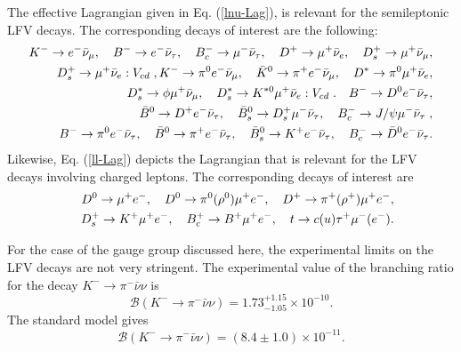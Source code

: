 \documentclass{ws-ijmpa}
\begin{document}
The effective Lagrangian given in Eq. (\ref{lnu-Lag}), is relevant for the semileptonic LFV decays. The corresponding decays of interest are the following:
\begin{eqnarray}
K^{-}  \to  e^{-}\bar{\nu}_{\mu}, \quad B^{-} \to  e^{-}\bar{\nu}_{\tau}, \quad B_c^{-} \to  \mu^{-}\bar{\nu}_{\tau}, \quad D^{+} \to  \mu^{+}\bar{\nu}_{e}, \quad D_{s}^{+} \to  \mu^{+}\bar{\nu}_{\mu},\notag\\
 \quad D_{s}^{+} \to  \mu^{+}\bar{\nu}_{e}: V_{cd}\;,
K^{-}  \to  \pi^{0} e^{-}\bar{\nu}_{\mu}, \quad \bar{K}^{0}\to \pi^{+} e^{-}\bar{\nu}_{\mu}, \quad D^{*} \to \pi^{0}\mu^{+}\bar{\nu}_{e},\label{decays-1}\\
 \quad D_{s}^{*} \to \phi \mu^{+}\bar{\nu}_{\mu}, \quad D_{s}^{*} \to  K^{* 0}\mu^{+}\bar{\nu}_{e}: V_{cd}\;. \quad
B^{-}  \to  D^{0} e^{-}\bar{\nu}_{\tau}, \label{decays-2}\\ 
\quad \bar{B}^{0}\to D^{+} e^{-}\bar{\nu}_{\tau}, \quad \bar{B}^{0}_{s} \to D^{+}_{s}\mu^{-}\bar{\nu}_{\tau}, \quad B_{c}^{-} \to J/\psi \mu^{-}\bar{\nu}_{\tau}\;,\label{decays-3}\\  
B^{-}  \to  \pi^{0} e^{-}\bar{\nu}_{\tau}, \quad \bar{B}^{0}\to \pi^{+} e^{-}\bar{\nu}_{\tau}, \quad \bar{B}^{0}_{s} \to K^{+}e^{-}\bar{\nu}_{\tau}, \quad B_{c}^{-} \to \bar{D}^{0}e^{-}\bar{\nu}_{\tau}\label{decays-4}.
\end{eqnarray}
Likewise, Eq. (\ref{ll-Lag}) depicts the Lagrangian that is relevant for the LFV decays involving charged leptons. The corresponding decays of interest are
\begin{eqnarray}
D^{0} \to \mu^{+}e^{-}, \quad D^{0} \to \pi^{0}(\rho^{0})\mu^{+}e^{-}, \quad D^{+} \to \pi^{+}(\rho^{+})\mu^{+}e^{-},\notag\\
\quad D_{s}^{+} \to K^{+}\mu^{+}e^{-}, \quad B^{+}_c \to B^{+} \mu^{+}e^{-} , \quad t \to c(u)\tau^{+}\mu^{-}(e^{-}) .\label{decays-5}
\end{eqnarray}

For the case of the gauge group discussed here, the experimental limits on the LFV decays are not very stringent. The experimental value of the branching ratio for the decay $K^{-} \to \pi^{-}\bar{\nu}\nu$ is \cite{pdg}
\begin{equation}
\mathcal{B}(K^{-} \to \pi^{-}\bar{\nu}\nu) = 1.73^{+1.15}_{-1.05}\times 10^{-10} \label{branching-K}.
\end{equation}
The standard model gives \cite{Buras}
\begin{equation}
\mathcal{B}(K^{-} \to \pi^{-}\bar{\nu}\nu) = (8.4 \pm 1.0)\times 10^{-11} \label{SMKnunu}.
\end{equation}
\end{document}
